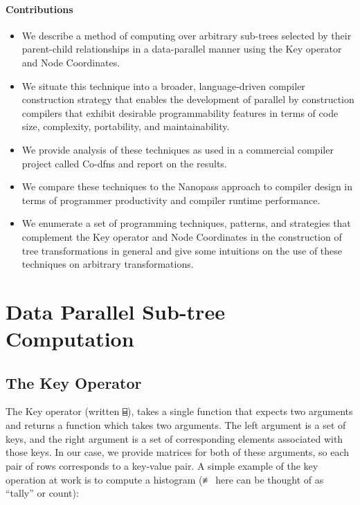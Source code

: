 \documentclass[pldi]{sigplanconf-pldi15}
\begin{document}
\paragraph{Contributions}

\begin{itemize}[noitemsep]
\item We describe a method of computing over arbitrary sub-trees selected by their parent-child 
relationships in a data-parallel manner using the Key operator and Node Coordinates.
\item We situate this technique into a broader, language-driven compiler construction strategy 
that enables the development of parallel by construction compilers that exhibit desirable programmability 
features in terms of code size, complexity, portability, and maintainability. 
\item We provide analysis of these techniques as used in a commercial compiler project called Co-dfns and 
report on the results.
\item We compare these techniques to the Nanopass approach to compiler design in terms of programmer 
productivity and compiler runtime performance. 
\item We enumerate a set of programming techniques, patterns, and strategies that complement the 
Key operator and Node Coordinates in the construction of tree transformations in general and give some 
intuitions on the use of these techniques on arbitrary transformations.
\end{itemize}
\section{Data Parallel Sub-tree Computation}

\subsection{The Key Operator}

The Key operator (written \verb;⌸;), takes a single function that expects two arguments and returns 
a function which takes two arguments. The left argument is a set of keys, and the right argument 
is a set of corresponding elements associated with those keys. In our case, we provide matrices 
for both of these arguments, so each pair of rows corresponds to a key-value pair. A simple example 
of the key operation at work is to compute a histogram (≢ here can be thought of as “tally” or count):
\end{document}
